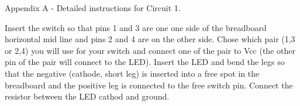 \documentclass{UoNMCHA}
\numberwithin{equation}{section}
\begin{document}
Appendix A  -  Detailed instructions for Circuit 1. 

Insert the switch so that pins 1 and 3 are one one side of the breadboard horizontal mid line and pins 2 and 4 are on the other side. Chose which pair (1,3 or 2,4) you will use for your switch and connect one of the pair to Vcc (the other pin of the pair will connect to the LED).  Insert the LED and bend the legs so that the negative (cathode, short leg) is inserted into a free spot in the breadboard and the positive leg is connected to the free switch pin. Connect the resistor between the LED cathod and ground.
\end{document}
